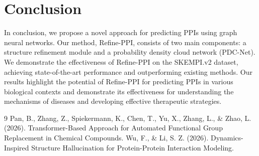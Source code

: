 \documentclass{article}
\begin{document}
        \section{Conclusion}
        In conclusion, we propose a novel approach for predicting PPIs using graph neural networks. Our method, Refine-PPI, consists of two main components: a structure refinement module and a probability density cloud network (PDC-Net). We demonstrate the effectiveness of Refine-PPI on the SKEMPI.v2 dataset, achieving state-of-the-art performance and outperforming existing methods. Our results highlight the potential of Refine-PPI for predicting PPIs in various biological contexts and demonstrate its effectiveness for understanding the mechanisms of diseases and developing effective therapeutic strategies.
        \begin{thebibliography}{9}
        Pan, B., Zhang, Z., Spiekermann, K., Chen, T., Yu, X., Zhang, L., \& Zhao, L. (2026). Transformer-Based Approach for Automated Functional Group Replacement in Chemical Compounds.
        Wu, F., \& Li, S. Z. (2026). Dynamics-Inspired Structure Hallucination for Protein-Protein Interaction Modeling.
        \end{thebibliography}
        
\end{document}
